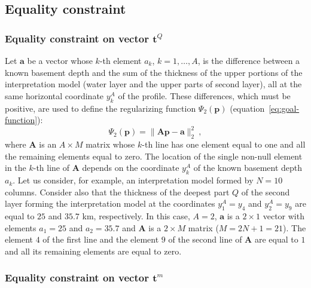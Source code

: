 \documentclass[manuscript]{geophysics}
\begin{document}
\subsection{Equality constraint}

\subsubsection*{Equality constraint on vector $\mathbf{t}^{Q}$}

Let $\mathbf{a}$ be a vector whose $k$-th element $a_{k}$,
$k = 1, \dots, A$, is the difference between a known basement depth and
the sum of the thickness of the upper portions of the interpretation model
(water layer and the upper parts of second layer), all at the same
horizontal coordinate $y^{A}_{k}$ of the profile. 
These differences, which must be positive, are used to define 
the regularizing function $\Psi_{2}(\mathbf{p})$ 
(equation~\ref{eq:goal-function}):
\begin{equation}
\Psi_{2}(\mathbf{p}) = \| \mathbf{A}\mathbf{p} - \mathbf{a} \|_{2}^{2} \: ,
\label{eq:equality-constraint-basement}
\end{equation}
where $\mathbf{A}$ is an $A \times M$ matrix whose $k$-th line has one element 
equal to one and all the remaining elements equal to zero. The location of the
single non-null element in the $k$-th line of $\mathbf{A}$ depends on the coordinate
$y^{A}_{k}$ of the known basement depth $a_{k}$. Let us consider, 
for example, an interpretation model formed by $N = 10$ columns. Consider also that 
the thickness of the deepest part $Q$ of the second layer forming the interpretation model 
at the coordinates $y^{A}_{1} = y_{4}$ and $y^{A}_{2} = y_{9}$ 
are equal to $25$ and $35.7$ km, respectively. In this case, $A = 2$,
$\mathbf{a}$ is a $2 \times 1$ vector with elements $a_{1} = 25$ and $a_{2} = 35.7$
and $\mathbf{A}$ is a $2 \times M$ matrix ($M = 2N + 1 = 21$). The element $4$ of the
first line and the element $9$ of the second line of $\mathbf{A}$ are equal to $1$ and
all its remaining elements are equal to zero.

\subsubsection*{Equality constraint on vector $\mathbf{t}^{m}$}
\end{document}

